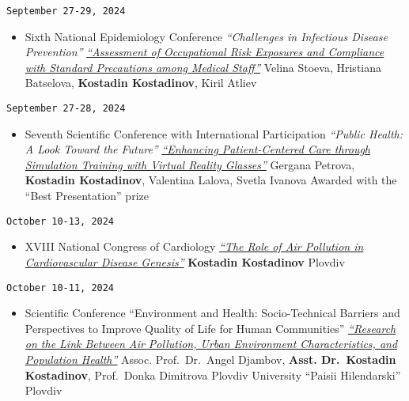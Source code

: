 \documentclass[
  12pt,
  letterpaper,
  DIV=11,
  numbers=noendperiod]{scrartcl}
\providecommand{\tightlist}{%
  \setlength{\itemsep}{0pt}\setlength{\parskip}{0pt}}\usepackage{longtable,booktabs,array}
\begin{document}
\texttt{September\ 27-29,\ 2024}

\begin{itemize}
\tightlist
\item
  Sixth National Epidemiology Conference \textbar{} \emph{``Challenges
  in Infectious Disease Prevention''} \textbar{}
  \href{http://bulepid.org/_upload2018/PROGRAMA\%202024-final.pdf}{\emph{``Assessment
  of Occupational Risk Exposures and Compliance with Standard
  Precautions among Medical Staff''}} \textbar{} Velina Stoeva,
  Hristiana Batselova, \textbf{Kostadin Kostadinov}, Kiril Atliev
\end{itemize}

\texttt{September\ 27-28,\ 2024}

\begin{itemize}
\tightlist
\item
  Seventh Scientific Conference with International Participation
  \textbar{} \emph{``Public Health: A Look Toward the Future''}
  \textbar{}
  \href{https://publisher.mu-plovdiv.bg/wp-content/uploads/published-online/public-health-conf/2024/abstract-book.html\#p=56}{\emph{``Enhancing
  Patient-Centered Care through Simulation Training with Virtual Reality
  Glasses''}} \textbar{} Gergana Petrova, \textbf{Kostadin Kostadinov},
  Valentina Lalova, Svetla Ivanova \textbar{} Awarded with the ``Best
  Presentation'' prize
\end{itemize}

\texttt{October\ 10-13,\ 2024}

\begin{itemize}
\tightlist
\item
  XVIII National Congress of Cardiology \textbar{}
  \href{https://www.bgcardio.org/storage/app/media/uploaded-files/XVIII\%20Congress\%20program_web.pdf}{\emph{``The
  Role of Air Pollution in Cardiovascular Disease Genesis''}} \textbar{}
  \textbf{Kostadin Kostadinov} \textbar{} Plovdiv
\end{itemize}

\texttt{October\ 10-11,\ 2024}

\begin{itemize}
\tightlist
\item
  Scientific Conference ``Environment and Health: Socio-Technical
  Barriers and Perspectives to Improve Quality of Life for Human
  Communities'' \textbar{}
  \href{https://hiddeneurope-jeanmonnet.uni-plovdiv.net/2024/10/\%d0\%bf\%d1\%80\%d0\%be\%d0\%b3\%d1\%80\%d0\%b0\%d0\%bc\%d0\%b0-\%d0\%bd\%d0\%b0-\%d0\%bd\%d0\%b0\%d1\%83\%d1\%87\%d0\%bd\%d0\%b0\%d1\%82\%d0\%b0-\%d0\%ba\%d0\%be\%d0\%bd\%d1\%84\%d0\%b5\%d1\%80\%d0\%b5\%d0\%bd\%d1\%86\%d0\%b8\%d1\%8f-\%d0\%be\%d0\%ba/}{\emph{``Research
  on the Link Between Air Pollution, Urban Environment Characteristics,
  and Population Health''}} \textbar{} Assoc. Prof.~Dr.~Angel Djambov,
  \textbf{Asst. Dr.~Kostadin Kostadinov}, Prof.~Donka Dimitrova
  \textbar{} Plovdiv University ``Paisii Hilendarski'' \textbar{}
  Plovdiv
\end{itemize}
\end{document}
